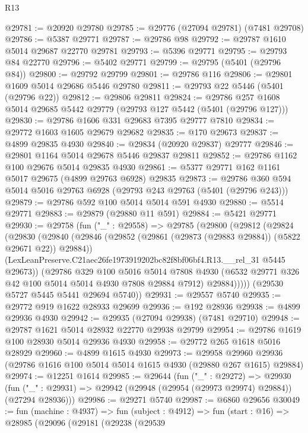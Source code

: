 \begin{lexlean}{R13}
\begin{coremodule}
@29781 := @20920 @29780
@29785 := @29776 (@27094 @29781) (@7481 @29708)
@29786 := @5387 @29771
@29787 := @29786 @98
@29792 := @29787 @1610 @5014 @29687 @22770 @29781
@29793 := @5396 @29771
@29795 := @29793 @84 @22770
@29796 := @5402 @29771
@29799 := @29795 (@5401 (@29796 @84))
@29800 := @29792 @29799
@29801 := @29786 @116
@29806 := @29801 @1609 @5014 @29686 @5446 @29780
@29811 := @29793 @22 @5446 (@5401 (@29796 @22))
@29812 := @29806 @29811
@29824 := @29786 @257 @1608 @5014 @29685 @5442 @29779 (@29793 @127 @5442 (@5401 (@29796 @127)))
@29830 := @29786 @1606 @331 @29683 @7395 @29777 @7810
@29834 := @29772 @1603 @1605 @29679 @29682
@29835 := @170 @29673
@29837 := @4899 @29835 @4930
@29840 := @29834 (@20920 @29837) @29777
@29846 := @29801 @1164 @5014 @29678 @5446 @29837 @29811
@29852 := @29786 @1162 @100 @29676 @5014 @29835 @4930
@29861 := @5377 @29771 @162 @1161 @5017 @29675 (@4899 @29763 @6928) @29835
@29873 := @29786 @360 @594 @5014 @5016 @29763 @6928 (@29793 @243 @29763 (@5401 (@29796 @243)))
@29879 := @29786 @592 @100 @5014 @5014 @591 @4930
@29880 := @5514 @29771
@29883 := @29879 (@29880 @11 @591)
@29884 := @5421 @29771
@29930 := @29758
    (fun ("_" : @29558) =>
    @29785
      (@29800
        (@29812
          (@29824
            (@29830
              (@29840
                (@29846 (@29852 (@29861 (@29873 (@29883 @29884)) (@5822 @29671 @22)) @29884))
                (LexLeanPreserve.C21aec26fe1973919202bc82f8bf06bf4.R13.__rel_31 @5445 @29673))
              (@29786
                @329
                @100
                @5016
                @5014
                @7808
                @4930
                (@6532 @29771 @326 @42 @100 @5014 @5014 @4930 @7808 @29884 @7912)
                @29884)))))
      (@29530 @5727 @5445 @5441 @29694 @5740))
@29931 := @29557 @5740
@29935 := @29772 @919 @1622 @28933 @29699
@29936 := @192 @28936
@29938 := @4899 @29936 @4930
@29942 := @29935 (@27094 @29938) (@7481 @29710)
@29948 := @29787 @1621 @5014 @28932 @22770 @29938 @29799
@29954 := @29786 @1619 @100 @28930 @5014 @29936 @4930
@29958 := @29772 @265 @1618 @5016 @28929
@29960 := @4899 @1615 @4930
@29973 := @29958
    @29960
    @29936
    (@29786 @1616 @100 @5014 @5014 @1615 @4930 (@29880 @267 @1615) @29884)
@29974 := @12251 @1614
@29985 := @29644
    (fun ("_" : @29272) =>
    @29930 (fun ("_" : @29931) => @29942 (@29948 (@29954 (@29973 @29974) @29884)) (@27294 @28936)))
@29986 := @29271 @5740
@29987 := @6860 @29656
@30049 := fun (machine : @4937) =>
  fun (subject : @4912) =>
  fun (start : @16) =>
  @28985
    (@29096
      (@29181
        (@29238
          (@29539

\end{coremodule}
\end{lexlean}
